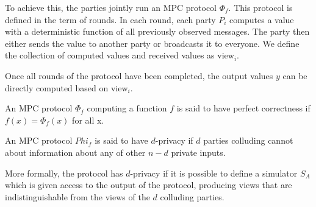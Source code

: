 To achieve this, the parties jointly run an MPC protocol $\Phi_{f}$. This protocol
is defined in the term of rounds.
In each round, each party $P_{i}$ computes a
value with a deterministic function of all previously observed messages.
The party then either sends the value to another party or broadcasts it to everyone.
We define the collection of
computed values and received values as $\text{view}_{i}$.

Once all rounds of the protocol have been completed, the output values $y$ can be
directly computed based on $\text{view}_{i}$.



\begin{definition}
  \label{def:mpc:correctness}
  An MPC protocol $\Phi_{f}$ computing a function $f$ is said to have perfect
  correctness if $f(x) = \Phi_{f}(x)$ for all x.
\end{definition}

\begin{definition}[d-Privacy]
\label{def:mpc:d-privacy}
  An MPC protocol $Phi_{f}$ is said to have $d$-privacy if $d$ parties colluding
  cannot about information about any of other $n-d$ private inputs.

  More formally, the protocol has $d$-privacy if it is possible to define a
  simulator $S_{A}$ which is given access to the output of the protocol,
  producing views that are indistinguishable from the views of the $d$ colluding
  parties.
\end{definition}

